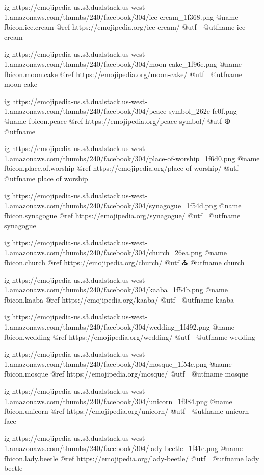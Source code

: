   ig https://emojipedia-us.s3.dualstack.us-west-1.amazonaws.com/thumbs/240/facebook/304/ice-cream_1f368.png
  @name fbicon.ice.cream
  @ref https://emojipedia.org/ice-cream/
  @utf 🍨
  @utfname ice cream

  ig https://emojipedia-us.s3.dualstack.us-west-1.amazonaws.com/thumbs/240/facebook/304/moon-cake_1f96e.png
  @name fbicon.moon.cake
  @ref https://emojipedia.org/moon-cake/
  @utf 🥮
  @utfname moon cake

  ig https://emojipedia-us.s3.dualstack.us-west-1.amazonaws.com/thumbs/240/facebook/304/peace-symbol_262e-fe0f.png
  @name fbicon.peace
  @ref https://emojipedia.org/peace-symbol/
  @utf ☮️
  @utfname



  ig https://emojipedia-us.s3.dualstack.us-west-1.amazonaws.com/thumbs/240/facebook/304/place-of-worship_1f6d0.png
  @name fbicon.place.of.worship
  @ref https://emojipedia.org/place-of-worship/
  @utf 🛐
  @utfname place of worship

  ig https://emojipedia-us.s3.dualstack.us-west-1.amazonaws.com/thumbs/240/facebook/304/synagogue_1f54d.png
  @name fbicon.synagogue
  @ref https://emojipedia.org/synagogue/
  @utf 🕍
  @utfname synagogue

  ig https://emojipedia-us.s3.dualstack.us-west-1.amazonaws.com/thumbs/240/facebook/304/church_26ea.png
  @name fbicon.church
  @ref https://emojipedia.org/church/
  @utf ⛪
  @utfname church

  ig https://emojipedia-us.s3.dualstack.us-west-1.amazonaws.com/thumbs/240/facebook/304/kaaba_1f54b.png
  @name fbicon.kaaba
  @ref https://emojipedia.org/kaaba/
  @utf 🕋
  @utfname kaaba

  ig https://emojipedia-us.s3.dualstack.us-west-1.amazonaws.com/thumbs/240/facebook/304/wedding_1f492.png
  @name fbicon.wedding
  @ref https://emojipedia.org/wedding/
  @utf 💒
  @utfname wedding

  ig https://emojipedia-us.s3.dualstack.us-west-1.amazonaws.com/thumbs/240/facebook/304/mosque_1f54c.png
  @name fbicon.mosque
  @ref https://emojipedia.org/mosque/
  @utf 🕌
  @utfname mosque

  ig https://emojipedia-us.s3.dualstack.us-west-1.amazonaws.com/thumbs/240/facebook/304/unicorn_1f984.png
  @name fbicon.unicorn
  @ref https://emojipedia.org/unicorn/
  @utf 🦄
  @utfname unicorn face

  ig https://emojipedia-us.s3.dualstack.us-west-1.amazonaws.com/thumbs/240/facebook/304/lady-beetle_1f41e.png
  @name fbicon.lady.beetle
  @ref https://emojipedia.org/lady-beetle/
  @utf 🐞
  @utfname lady beetle

